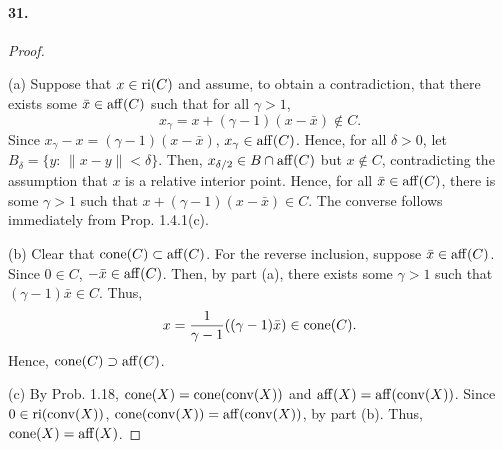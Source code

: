   \paragraph{31.}
  \begin{proof}
    $\,$\par
    (a) Suppose that $x\in\operatorname{ri}(C)$ and assume, to obtain a contradiction, that 
    there exists some $\bar{x}\in\operatorname{aff}(C)$ such that for all $\gamma>1$, 
    \[
      x_\gamma=x+(\gamma-1)(x-\bar{x})\notin C.
    \]
    Since $x_\gamma-x=(\gamma-1)(x-\bar{x})$, $x_\gamma\in\operatorname{aff}(C)$. Hence, for
    all $\delta>0$, let $B_\delta=\{y:\, \|x-y\|<\delta\}$. Then, $x_{\delta/
    2}\in B\cap\operatorname{aff}(C)$ but $x\notin C$, contradicting the assumption that $x$
    is a relative interior point. Hence, for all $\bar{x}\in\operatorname{aff}(C)$, there is
    some $\gamma>1$ such that $x+(\gamma-1)(x-\bar{x})\in C$. The converse
    follows immediately from Prop. 1.4.1(c).\par
    (b) Clear that $\operatorname{cone}(C)\subset\operatorname{aff}(C)$. For the reverse inclusion, suppose
    $\bar{x}\in\operatorname{aff}(C)$. Since $0\in C$, $-\bar{x}\in\operatorname{aff}(C)$. Then, by part 
    (a), there exists some $\gamma>1$ such that $(\gamma-1)\bar{x}\in C$. Thus,
    \[
      x=\frac{1}{\gamma-1}((\gamma-1)\bar{x})\in\operatorname{cone}(C).
    \]
    Hence, $\operatorname{cone}(C)\supset\operatorname{aff}(C)$. \par
    (c) By Prob. 1.18, $\operatorname{cone}(X)=\operatorname{cone}(\operatorname{conv}(X))$ and $\operatorname{aff}(X)=\operatorname{aff}(\operatorname{conv}(X))$.
    Since $0\in\operatorname{ri}(\operatorname{conv}(X))$, $\operatorname{cone}(\operatorname{conv}(X))=\operatorname{aff}(\operatorname{conv}(X))$, by part (b).
    Thus, $\operatorname{cone}(X)=\operatorname{aff}(X)$.
  \end{proof}
  
